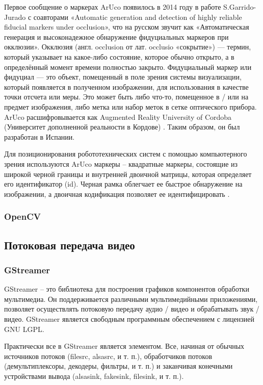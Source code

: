 Первое сообщение о маркерах ArUco появилось в 2014 году в работе S.Garrido-Jurado с соавторами «Automatic generation and detection of highly reliable fiducial markers under occlusion», что на русском звучит как «Автоматическая генерация и высоконадежное обнаружение фидуциальных маркеров при окклюзии».
Окклюзия (англ. occlusion от лат. occlusio «сокрытие») — термин, который указывает на какое-либо состояние, которое обычно открыто, а в определённый момент времени полностью закрыто.
Фидуциальный маркер или фидуциал — это объект, помещенный в поле зрения системы визуализации, который появляется в полученном изображении, для использования в качестве точки отсчета или меры. Это может быть либо что-то, помещенное в / или на предмет изображения, либо метка или набор меток в сетке оптического прибора.
ArUco расшифровывается как Augmented Reality University of Cordoba (Университет дополненной реальности в Кордове) \cite{aruco}. Таким образом, он был разработан в Испании.

Для позиционирования робототехнических систем с помощью компьютерного зрения используются ArUco маркеры -- квадратные маркеры, состоящие из широкой черной границы и внутренней двоичной матрицы, которая определяет его идентификатор (id). Черная рамка облегчает ее быстрое обнаружение на изображении, а двоичная кодификация позволяет ее идентифицировать \cite{opencv}.

\subsubsection{OpenCV}



\subsection{Потоковая передача видео}

\subsubsection{GStreamer}

GStreamer -- это библиотека для построения графиков компонентов обработки мультимедиа. Он поддерживается различными мультимедийными приложениями, позволяет осуществлять потоковую передачу аудио / видео и обрабатывать звук / видео. GStreamer является свободным программным обеспечением с лицензией GNU LGPL.

Практически все в GStreamer является элементом. Все, начиная от обычных источников потоков (filesrc, alsasrc, и т. п.), обработчиков потоков (демультиплексоры, декодеры, фильтры, и т. п.) и заканчивая конечными устройствами вывода (alsasink, fakesink, filesink, и т. п.).

